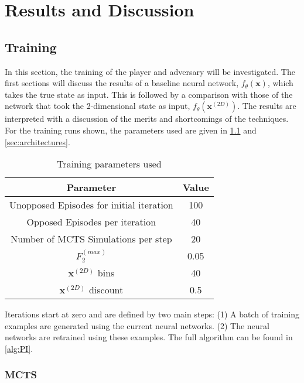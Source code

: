 \documentclass[../main.tex]{subfiles}
\begin{document}
\onlyinsubfile{\tableofcontents{}}

\chapter{Results and Discussion}

\section{Training}

In this section, the training of the player and adversary will be investigated. The first sections will discuss the results of a baseline neural network, $f_{\theta}(\boldsymbol{x})$, which takes the true state as input. This is followed by a comparison with those of the network that took the 2-dimensional state as input, $f_{\theta}(\boldsymbol{x}^{(2D)})$. The results are interpreted with a discussion of the merits and shortcomings of the techniques. For the training runs shown, the parameters used are given in \cref{tab:tparams} and \cref{sec:architectures}.

\begin{table}[h]
    \centering
    \begin{tabular}{c | c}
        Parameter & Value \\
        \hline
        Unopposed Episodes for initial iteration &  100\\
        Opposed Episodes per iteration &  40\\
        Number of MCTS Simulations per step & 20 \\
        $F_2^{(max)}$  &  0.05\\
        $\boldsymbol{x}^{(2D)}$ bins & 40 \\
        $\boldsymbol{x}^{(2D)}$ discount &  0.5\\
    \end{tabular}
    \caption{Training parameters used}
    \label{tab:tparams}
\end{table}

Iterations start at zero and are defined by two main steps: (1) A batch of training examples are generated using the current neural networks. (2) The neural networks are retrained using these examples. The full algorithm can be found in \cref{alg:PI}.

\subsection{MCTS}
\end{document}
